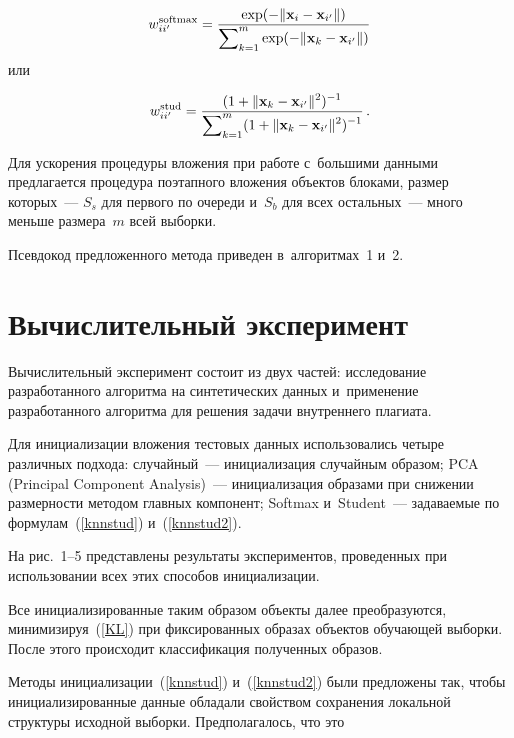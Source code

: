 \begin{multicols}{2}

\noindent
\begin{equation}
\label{knnstud}
w_{ii'}^{\mathrm{softmax}} = \displaystyle\frac{\displaystyle \exp(-\|\mathbf x_i - \mathbf x_{i'} \| )\mathstrut}{\displaystyle \sum\nolimits_{k = 1}^m\exp(-\|\mathbf x_k - \mathbf x_{i'} \| )\mathstrut}
\end{equation}
или

\noindent
\begin{equation}
\label{knnstud2}
 w_{ii'}^{\mathrm{stud}}= \displaystyle\frac{\displaystyle (1 + \|\mathbf x_k - \mathbf x_{i'}\|^2)^{-1}\mathstrut}{\displaystyle \sum\nolimits_{k = 1}^m (1 + \|\mathbf x_k - \mathbf x_{i'}\|^2)^{-1}\mathstrut}\,.
\end{equation}

Для ускорения процедуры вложения при работе с~большими данными предлагается 
процедура поэтапного вложения объектов блоками, размер которых~--- $S_s$ для 
первого по очереди и~$S_b$ для всех остальных~--- много меньше размера~$m$ всей 
вы\-борки.

Псевдокод предложенного метода приведен в~алгоритмах~1 и~2.

\vspace*{-5pt}

\section{Вычислительный эксперимент}

\vspace*{-2pt}

Вычислительный эксперимент состоит из двух частей: исследование 
разработанного алгоритма на синтетических данных и~применение разработанного 
алгоритма для решения задачи внутреннего плагиата.

Для инициализации вложения тестовых данных использовались четыре различных подхода: 
случайный~--- инициализация случайным образом; PCA (Principal Component Analysis)~--- 
инициализация образами при 
снижении раз\-мер\-ности методом главных компонент; Softmax и~Student~--- задаваемые 
по формулам~(\ref{knnstud}) и~(\ref{knnstud2}). 

На рис.~1--5 представлены 
результаты экспериментов, проведенных при использовании всех этих способов 
инициализации.

Все инициализированные таким образом объекты далее преобразуются, 
минимизируя~(\ref{KL}) при фиксированных образах объектов обучающей выборки. 
После этого происходит классификация полученных образов.



Методы инициализации~(\ref{knnstud}) и~(\ref{knnstud2}) были предложены так, 
чтобы инициализированные данные обладали свойством сохранения локальной структуры 
исходной выборки. Предполагалось, что это\linebreak\vspace*{-12pt}

\pagebreak

\end{multicols}

